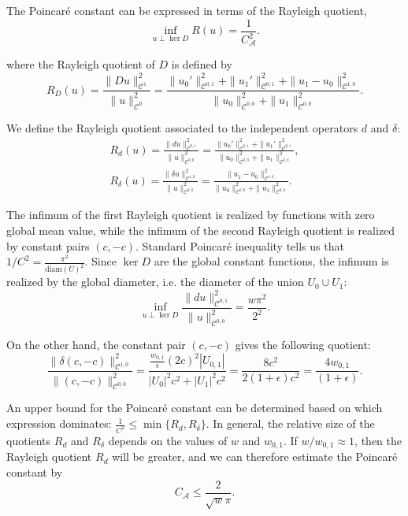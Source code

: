 \documentclass[reqno]{amsart}
\numberwithin{equation}{section}
\theoremstyle{definition}
\newcommand{\Ac}{\mathcal{A}}
\newcommand{\Cc}{\mathcal{C}}
\begin{document}
The Poincaré constant can be expressed in terms of the Rayleigh quotient,
\begin{equation}
\inf_{u \perp \ker D} R(u) = \frac{1}{C_{\Ac}^2}.
\end{equation}

where the Rayleigh quotient of $D$ is defined by
\begin{equation}
R_D(u) = \frac{\|Du\|_{\Cc^{1}}^2}{\|u\|_{\Cc^{0}}^2} = \frac{\|u_0'\|^2_{\Cc^{0,1}}+\|u_1'\|_{\Cc^{0,1}}^2+\|u_1-u_0\|^2_{\Cc^{1,0}}}{\|u_0\|^2_{\Cc^{0,0}} +\|u_1\|_{\Cc^{0,0}}^2}.
\end{equation}


We define the Rayleigh quotient associated to the independent operators $d$ and $\delta$:
\begin{subequations}
\begin{align}
R_d(u) = \frac{\|du\|_{\Cc^{0,1}}^2}{\|u\|_{\Cc^{0,0}}^2} = \frac{\|u_0'\|_{\Cc^{0,1}}^2 +\|u_1'\|_{\Cc^{0,1}}^2}{\|u_0\|_{\Cc^{0,0}}^2 +\|u_1\|^2 _{\Cc^{0,0}}}, \\
R_\delta(u) = \frac{\|\delta u\|_{\Cc^{1,0}}^2}{\|u\|_{\Cc^{0,0}}^2} = \frac{\|u_1-u_0\|^2_{\Cc^{1,0}}}{\|u_0\|^2_{\Cc^{0,0}} +\|u_1\|^2_{\Cc^{0,0}}}.
\end{align}
\end{subequations}

The infimum of the first Rayleigh quotient is realized by functions with zero global mean value, while the infimum of the second Rayleigh quotient is realized by constant pairs $(c, -c)$. Standard Poincaré inequality tells us that $1/C^2 = \frac{\pi^2}{\mathrm{diam}(U)^2}$. Since $\ker D$ are the global constant functions, the infimum is realized by the global diameter, i.e. the diameter of the union $U_0 \cup U_1$:
\begin{equation}
\inf_{u \perp \ker D} \frac{\|du\|_{\Cc^{0,1}}^2}{\|u\|_{\Cc^{0,0}}^2} = \frac{w\pi^2}{2^2}.
\end{equation}

On the other hand, the constant pair $(c, -c)$ gives the following quotient:
\begin{equation}
\frac{\|\delta(c, -c)\|_{\Cc^{1,0}}^2}{\|(c, -c)\|_{\Cc^{0,0}}^2} =\frac{\frac{w_{0,1}}{\epsilon}(2c)^2|U_{0,1}|}{|U_0|^2c^2+|U_1|^2 c^2} = \frac{8c^2}{2(1+\epsilon)c^2} = \frac{4w_{0,1}}{(1+\epsilon)}.
\end{equation}

An upper bound for the Poincaré constant can be determined based on which expression dominates: $\frac{1}{C^2} \leq \min\{R_d, R_\delta\}$. In general, the relative size of the quotients $R_d$ and $R_\delta$ depends on the values of $w$ and $w_{0,1}$. If $w/w_{0,1} \approx 1$, then the Rayleigh quotient $R_d$ will be greater, and we can therefore estimate the Poincaré constant by
\begin{equation}
C_{\Ac} \leq \frac{2}{\sqrt{w}\pi}.
\end{equation}
\end{document}
